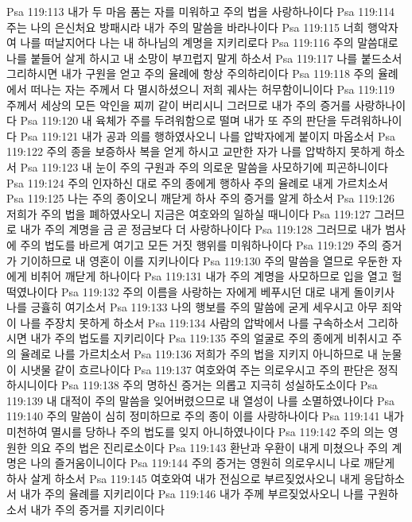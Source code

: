 Psa 119:113  내가 두 마음 품는 자를 미워하고 주의 법을 사랑하나이다
Psa 119:114  주는 나의 은신처요 방패시라 내가 주의 말씀을 바라나이다
Psa 119:115  너희 행악자여 나를 떠날지어다 나는 내 하나님의 계명을 지키리로다
Psa 119:116  주의 말씀대로 나를 붙들어 살게 하시고 내 소망이 부끄럽지 말게 하소서
Psa 119:117  나를 붙드소서 그리하시면 내가 구원을 얻고 주의 율례에 항상 주의하리이다
Psa 119:118  주의 율례에서 떠나는 자는 주께서 다 멸시하셨으니 저희 궤사는 허무함이니이다
Psa 119:119  주께서 세상의 모든 악인을 찌끼 같이 버리시니 그러므로 내가 주의 증거를 사랑하나이다
Psa 119:120  내 육체가 주를 두려워함으로 떨며 내가 또 주의 판단을 두려워하나이다
Psa 119:121  내가 공과 의를 행하였사오니 나를 압박자에게 붙이지 마옵소서
Psa 119:122  주의 종을 보증하사 복을 얻게 하시고 교만한 자가 나를 압박하지 못하게 하소서
Psa 119:123  내 눈이 주의 구원과 주의 의로운 말씀을 사모하기에 피곤하니이다
Psa 119:124  주의 인자하신 대로 주의 종에게 행하사 주의 율례로 내게 가르치소서
Psa 119:125  나는 주의 종이오니 깨닫게 하사 주의 증거를 알게 하소서
Psa 119:126  저희가 주의 법을 폐하였사오니 지금은 여호와의 일하실 때니이다
Psa 119:127  그러므로 내가 주의 계명을 금 곧 정금보다 더 사랑하나이다
Psa 119:128  그러므로 내가 범사에 주의 법도를 바르게 여기고 모든 거짓 행위를 미워하나이다
Psa 119:129  주의 증거가 기이하므로 내 영혼이 이를 지키나이다
Psa 119:130  주의 말씀을 열므로 우둔한 자에게 비취어 깨닫게 하나이다
Psa 119:131  내가 주의 계명을 사모하므로 입을 열고 헐떡였나이다
Psa 119:132  주의 이름을 사랑하는 자에게 베푸시던 대로 내게 돌이키사 나를 긍휼히 여기소서
Psa 119:133  나의 행보를 주의 말씀에 굳게 세우시고 아무 죄악이 나를 주장치 못하게 하소서
Psa 119:134  사람의 압박에서 나를 구속하소서 그리하시면 내가 주의 법도를 지키리이다
Psa 119:135  주의 얼굴로 주의 종에게 비취시고 주의 율례로 나를 가르치소서
Psa 119:136  저희가 주의 법을 지키지 아니하므로 내 눈물이 시냇물 같이 흐르나이다
Psa 119:137  여호와여 주는 의로우시고 주의 판단은 정직하시니이다
Psa 119:138  주의 명하신 증거는 의롭고 지극히 성실하도소이다
Psa 119:139  내 대적이 주의 말씀을 잊어버렸으므로 내 열성이 나를 소멸하였나이다
Psa 119:140  주의 말씀이 심히 정미하므로 주의 종이 이를 사랑하나이다
Psa 119:141  내가 미천하여 멸시를 당하나 주의 법도를 잊지 아니하였나이다
Psa 119:142  주의 의는 영원한 의요 주의 법은 진리로소이다
Psa 119:143  환난과 우환이 내게 미쳤으나 주의 계명은 나의 즐거움이니이다
Psa 119:144  주의 증거는 영원히 의로우시니 나로 깨닫게 하사 살게 하소서
Psa 119:145  여호와여 내가 전심으로 부르짖었사오니 내게 응답하소서 내가 주의 율례를 지키리이다
Psa 119:146  내가 주께 부르짖었사오니 나를 구원하소서 내가 주의 증거를 지키리이다
